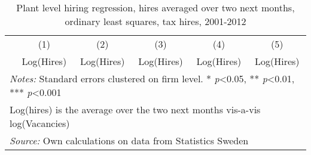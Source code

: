 \begin{table}[htbp]\centering
\def\sym#1{\ifmmode^{#1}\else\(^{#1}\)\fi}
\caption{Plant level hiring regression, hires averaged over two next months, ordinary least squares, tax hires, 2001-2012}
\label{tab:robust:2m}
\begin{tabular}{l*{5}{c}}
\hline\hline
                &\multicolumn{1}{c}{(1)}&\multicolumn{1}{c}{(2)}&\multicolumn{1}{c}{(3)}&\multicolumn{1}{c}{(4)}&\multicolumn{1}{c}{(5)}\\
                &\multicolumn{1}{c}{Log(Hires)}&\multicolumn{1}{c}{Log(Hires)}&\multicolumn{1}{c}{Log(Hires)}&\multicolumn{1}{c}{Log(Hires)}&\multicolumn{1}{c}{Log(Hires)}\\
\hline


\hline 


\hline\hline
\multicolumn{6}{l}{\footnotesize \emph{Notes:} Standard errors clustered on firm level. * \emph{p}<0.05, ** \emph{p}<0.01, *** \emph{p}<0.001}\\
\multicolumn{6}{l}{\footnotesize Log(hires) is the average over the two next months vis-a-vis log(Vacancies)}\\
\multicolumn{6}{l}{\footnotesize \emph{Source:} Own calculations on data from Statistics Sweden}\\
\end{tabular}
\end{table}
